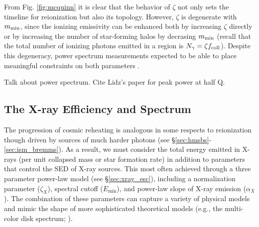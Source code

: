 From Fig. \ref{fig:mcquinn} it is clear that the behavior of $\zeta$ not only sets the timeline for reionization but also its topology. However, $\zeta$ is degenerate with $m_{\text{min}}$, since the ionizing emissivity can be enhanced both by increasing $\zeta$ directly or by increasing the number of star-forming halos by decrasing $m_{\text{min}}$ (recall that the total number of ionizing photons emitted in a region is $N_{\gamma} = \zeta f_{\text{coll}}$). Despite this degeneracy, power spectrum measurements expected to be able to place meaningful constraints on both parameters \cite{Greig2017}.


{\color{red} Talk about power spectrum. Cite Lidz's paper \cite{Lidz2008} for peak power at half Q.}


\subsection{The X-ray Efficiency and Spectrum}
The progression of cosmic reheating is analogous in some respects to reionization though driven by sources of much harder photons (see \S\ref{sec:hmsbs}-\ref{sec:ism_bremms}). As a result, we must consider the total energy emitted in X-rays (per unit collapsed mass or star formation rate) in addition to parameters that control the SED of X-ray sources. This most often achieved through a three parameter power-law model (see \S\ref{sec:xray_esc}), including a normalization parameter ($\zeta_X$), spectral cutoff ($E_{\min}$), and power-law slope of X-ray emission ($\alpha_X$). The combination of these parameters can capture a variety of physical models and mimic the shape of more sophisticated theoretical models (e.g., the multi-color disk spectrum; \cite{Mitsuda1984}).

